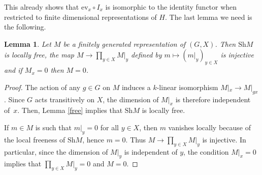 \documentclass{amsart}
\newtheorem{lemma}[theorem]{Lemma}
\theoremstyle{definition}
\begin{document}
This already shows that $\mathrm{ev}_x \circ I_x$ is isomorphic to the identity functor when restricted to finite dimensional representations of $H$. The last lemma we need is the following.

\begin{lemma} \label{pointwise}
Let $M$ be a finitely generated representation of $(G,X)$. Then $\mathrm{Sh} M$ is locally free, the map $M \to \prod_{y \in X} M|_y$ defined by $m \mapsto (m|_y)_{y \in X}$ is injective and if $M_x = 0$ then $M = 0$.
\end{lemma}

\begin{proof}
    The action of any $g \in G$ on $M$ induces a $k$-linear isomorphism $M|_x \to M |_{gx}$. Since $G$ acts transitively on $X$, the dimension of $M|_x$ is therefore independent of~$x$. Then, Lemma \ref{free} implies that $\mathrm{Sh} M$ is locally free.
    
    If $m \in M$ is such that $m|_y = 0$ for all $y\in X$, then $m$ vanishes locally because of the local freeness of $\mathrm{Sh} M$, hence $m =0$. Thus $M \to \prod_{y \in X} M|_y$ is injective. In particular, since the dimension of $M|_y$ is independent of $y$, the condition $M|_x = 0$ implies that $\prod_{y \in X} M|_y = 0$ and $M = 0$.
\end{proof}
\end{document}
